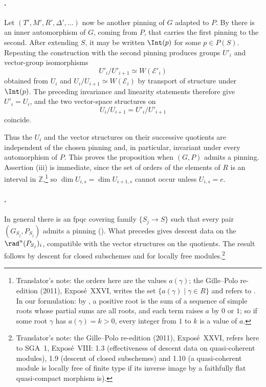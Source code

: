 \paragraph{.}
Let \((T',M',R',\Delta',\ldots)\) now be another pinning of \(G\) adapted
to \(P\).  By  there is an inner automorphism of \(G\), coming from
\(P\), that carries the first pinning to the second.  After extending
\(S\), it may be written \(\Int(p)\) for some \(p\in P(S)\).
Repeating the construction with the second pinning produces groups
\(U'_i\) and vector-group isomorphisms
\[
 U'_i/U'_{i+1}\simeq W(\mathcal E'_i)
\]
obtained from \(U_i\) and
\(U_i/U_{i+1}\simeq W(\mathcal E_i)\) by transport of structure under
\(\Int(p)\).  The preceding invariance and linearity statements therefore
give \(U'_i=U_i\), and the two vector-space structures on
\[
 U_i/U_{i+1}=U'_i/U'_{i+1}
\]
coincide.

Thus the \(U_i\) and the vector structures on their successive quotients
are independent of the chosen pinning and, in particular, invariant under
every automorphism of \(P\).  This proves the proposition when \((G,P)\)
admits a pinning.  Assertion (iii) is immediate, since the set of orders of
the elements of \(R\) is an interval in \(\mathbb Z\),\footnote{Translator's note: the orders here are the values \(a(\gamma)\); the
Gille--Polo re-edition (2011), Exposé~XXVI, writes the set
\(\{a(\gamma)\mid\gamma\in R\}\) and refers to . In our
formulation: by , a positive root is the sum of a sequence
of simple roots whose partial sums are all roots, and each term raises \(a\)
by \(0\) or \(1\); so if some root \(\gamma\) has \(a(\gamma)=k>0\), every
integer from \(1\) to \(k\) is a value of \(a\).} so
\(\dim U_{i,s}=\dim U_{i+1,s}\) cannot occur unless \(U_{i,s}=e\).

\paragraph{.}
In general there is an fpqc covering family \(\{S_j\to S\}\) such that
every pair \((G_{S_j},P_{S_j})\) admits a pinning ().  What precedes
gives descent data on the \(\rad^u(P_{S_j})_i\), compatible with the
vector structures on the quotients.  The result follows by descent for
closed subschemes and for locally free modules.\footnote{Translator's note: the Gille--Polo re-edition (2011), Exposé~XXVI, refers
here to SGA~1, Exposé~VIII: 1.3 (effectiveness of descent data on
quasi-coherent modules), 1.9 (descent of closed subschemes) and 1.10 (a
quasi-coherent module is locally free of finite type if its inverse image by
a faithfully flat quasi-compact morphism is).}


